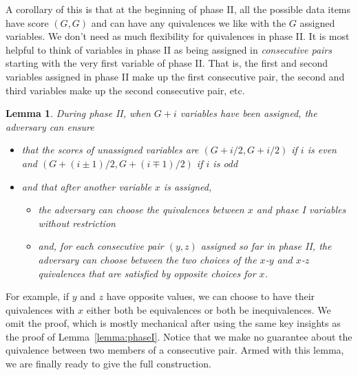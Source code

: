 \documentclass[11pt,letter]{article}
\newtheorem{lemma}[theorem]{Lemma}
\numberwithin{theorem}{section}
\begin{document}
A corollary of this is that at the beginning of phase II,
all the possible data items have score $(G,G)$
and can have any quivalences we like with the $G$ assigned variables.
We don't need as much flexibility for quivalences in phase II.
It is most helpful to think of variables in phase II
as being assigned in \emph{consecutive pairs}
starting with the very first variable of phase II.
That is, the first and second variables assigned in phase II
make up the first consecutive pair,
the second and third variables make up the second consecutive pair, etc.

\begin{lemma}\label{lemma:phaseII}
  During phase II, when $G+i$ variables have been assigned,
  the adversary can ensure
  \begin{itemize}
  \item
    that the scores of unassigned variables
    are $(G+i/2,G+i/2)$ if $i$ is even
    and $(G+(i\pm1)/2,G+(i\mp1)/2)$ if $i$ is odd
  \item
    and that after another variable $x$ is assigned,
    \begin{itemize}
    \item
      the adversary can choose the quivalences
      between $x$ and phase I variables without restriction
    \item
      and, for each consecutive pair $(y,z)$ assigned so far in phase II,
      the adversary can choose between
      the two choices of the $x$-$y$ and $x$-$z$ quivalences
      that are satisfied by opposite choices for $x$.
    \end{itemize}
  \end{itemize}
\end{lemma}

For example, if $y$ and $z$ have opposite values,
we can choose to have their quivalences with $x$
either both be equivalences or both be inequivalences.
We omit the proof, which is mostly mechanical
after using the same key insights as the proof of Lemma~\ref{lemma:phaseI}.
Notice that we make no guarantee about the quivalence
between two members of a consecutive pair.
Armed with this lemma, we are finally ready to give the full construction.
\end{document}
